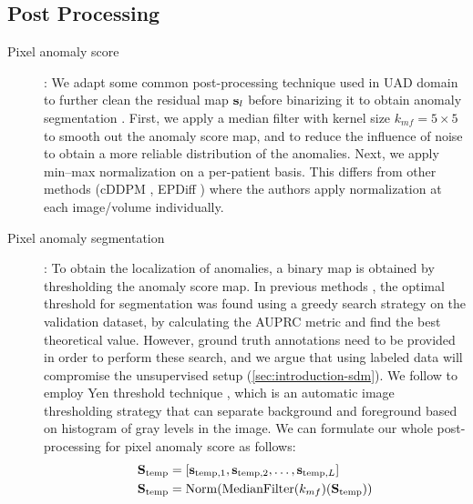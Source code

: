 \subsection{Post Processing}
\label{sec:post-process}
\begin{description}
    \item[Pixel anomaly score]: We adapt some common post-processing technique used in UAD domain to further clean the residual map ${\mathbf{s}}_{l}$ before binarizing it to obtain anomaly segmentation \cite{behrendt2025cDDPM, baur_autoencoders_2020}. First, we apply a median filter with kernel size $k_{mf} = 5 \times 5$ to smooth out the anomaly score map, and to reduce the influence of noise to obtain a more reliable distribution of the anomalies. Next, we apply min–max normalization on a per-patient basis. This differs from other methods (cDDPM \cite{behrendt2025cDDPM}, EPDiff \cite{wangEPDiffErasurePerception2025}) where the authors apply normalization at each image/volume individually. 
    \item[Pixel anomaly segmentation]: To obtain the localization of anomalies, a binary map is obtained by thresholding the anomaly score map. In previous methods \cite{autoDDPM, behrendt2025cDDPM, DDAD}, the optimal threshold for segmentation was found using a greedy search strategy on the validation dataset, by calculating the AUPRC metric and find the best theoretical value. However, ground truth annotations need to be provided in order to perform these search, and we argue that using labeled data will compromise the unsupervised setup (\cref{sec:introduction-sdm}). We follow \cite{wangEPDiffErasurePerception2025} to employ Yen threshold technique \cite{YenThreshold}, which is an automatic image thresholding strategy that can separate background and foreground based on histogram of gray levels in the image. We can formulate our whole post-processing for pixel anomaly score as follows: 
    \begin{equation}
    \label{eq:post-process-pixel}
        \begin{aligned}
            \mathbf{S}_{\text{temp}} &= [\rvs_{\text{temp},1}, \rvs_{\text{temp},2}, \dots, \rvs_{\text{temp},L}] \\
            \mathbf{S}_{\text{temp}} &= \mathrm{Norm} (\mathrm{MedianFilter}(k_{mf})(\mathbf{S}_{\text{temp}})) \\

\end{aligned}
\end{equation}
\end{description}
